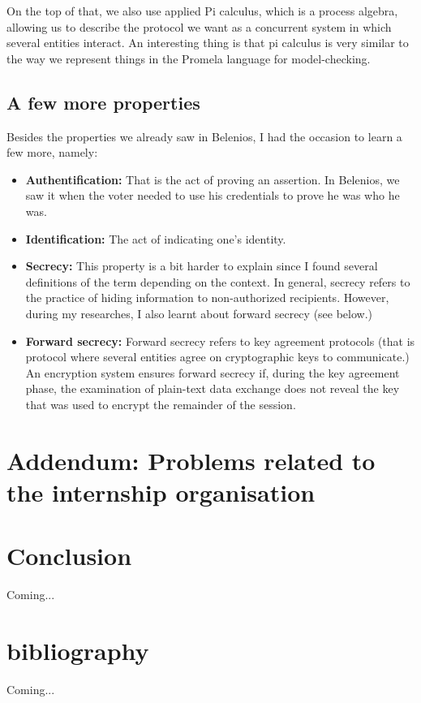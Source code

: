 \documentclass[12pt, a4paper]{report}
\begin{document}
On the top of that, we also use applied Pi calculus, which is a process algebra, allowing us to describe the protocol we want as a concurrent system in which several entities interact. An interesting thing is that pi calculus is very similar to the way we represent things in the Promela language for model-checking. 

\subsection{A few more properties}

Besides the properties we already saw in Belenios, I had the occasion to learn a few more, namely:

\begin{itemize}
\item \textbf{Authentification:} That is the act of proving an assertion. In Belenios, we saw it when the voter needed to use his credentials to prove he was who he was.

\item \textbf{Identification:} The act of indicating one's identity. 

\item \textbf{Secrecy:} This property is a bit harder to explain since I found several definitions of the term depending on the context. In general, secrecy refers to the practice of hiding information to non-authorized recipients. However, during my researches, I also learnt about forward secrecy (see below.)

\item \textbf{Forward secrecy:} Forward secrecy refers to key agreement protocols (that is protocol where several entities agree on cryptographic keys to communicate.) An encryption system ensures forward secrecy if, during the key agreement phase, the examination of plain-text data exchange does not reveal the key that was used to encrypt the remainder of the session.

\end{itemize}

\section{Addendum: Problems related to the internship organisation}

\section{Conclusion}

Coming...

\section{bibliography}


Coming...
\end{document}
